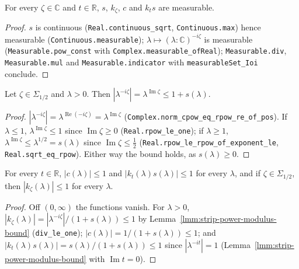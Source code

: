 \begin{lemma}
    \label{lmm:strip-power-functions-measurable}
    \leanok
    For every $\zeta \in \mathbb{C}$ and $t \in \mathbb{R}$, $s$, $k_\zeta$, $c$ and $k_t s$ are measurable.
\end{lemma}
\begin{proof}
    \leanok
    $s$ is continuous (\texttt{Real.continuous\_sqrt}, \texttt{Continuous.max}) hence measurable (\texttt{Continuous.measurable}); $\lambda \mapsto (\lambda : \mathbb{C})^{-i\zeta}$ is measurable (\texttt{Measurable.pow\_const} with \texttt{Complex.measurable\_ofReal}); \texttt{Measurable.div}, \texttt{Measurable.mul} and \texttt{Measurable.indicator} with \texttt{measurableSet\_Ioi} conclude.
\end{proof}

\begin{lemma}
    \label{lmm:strip-power-modulus-bound}
    \leanok
    Let $\zeta \in \Sigma_{1/2}$ and $\lambda > 0$. Then $|\lambda^{-i\zeta}| = \lambda^{\operatorname{Im}\zeta} \le 1 + s(\lambda)$.
\end{lemma}
\begin{proof}
    \leanok
    $|\lambda^{-i\zeta}| = \lambda^{\operatorname{Re}(-i\zeta)} = \lambda^{\operatorname{Im}\zeta}$ (\texttt{Complex.norm\_cpow\_eq\_rpow\_re\_of\_pos}). If $\lambda \le 1$, $\lambda^{\operatorname{Im}\zeta} \le 1$ since $\operatorname{Im}\zeta \ge 0$ (\texttt{Real.rpow\_le\_one}); if $\lambda \ge 1$, $\lambda^{\operatorname{Im}\zeta} \le \lambda^{1/2} = s(\lambda)$ since $\operatorname{Im}\zeta \le \tfrac{1}{2}$ (\texttt{Real.rpow\_le\_rpow\_of\_exponent\_le}, \texttt{Real.sqrt\_eq\_rpow}). Either way the bound holds, as $s(\lambda) \ge 0$.
\end{proof}

\begin{lemma}
    \label{lmm:strip-power-functions-bounded}
    \leanok
    For every $t \in \mathbb{R}$, $|c(\lambda)| \le 1$ and $|k_t(\lambda)s(\lambda)| \le 1$ for every $\lambda$, and if $\zeta \in \Sigma_{1/2}$, then $|k_\zeta(\lambda)| \le 1$ for every $\lambda$.
\end{lemma}
\begin{proof}
    \leanok
    Off $(0, \infty)$ the functions vanish. For $\lambda > 0$, $|k_\zeta(\lambda)| = |\lambda^{-i\zeta}|/(1 + s(\lambda)) \le 1$ by Lemma~\ref{lmm:strip-power-modulus-bound} (\texttt{div\_le\_one}); $|c(\lambda)| = 1/(1 + s(\lambda)) \le 1$; and $|k_t(\lambda)s(\lambda)| = s(\lambda)/(1 + s(\lambda)) \le 1$ since $|\lambda^{-it}| = 1$ (Lemma~\ref{lmm:strip-power-modulus-bound} with $\operatorname{Im} t = 0$).
\end{proof}

